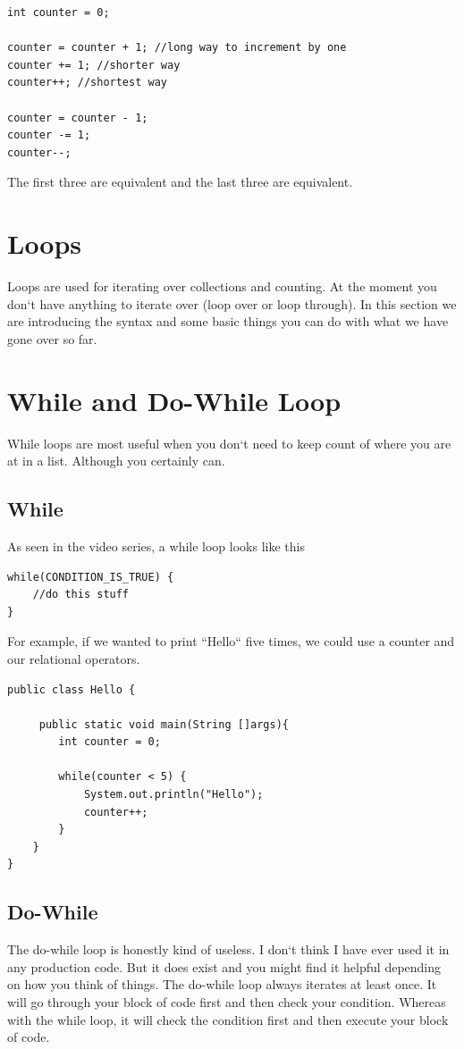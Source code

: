 \documentclass[11]{article}
\begin{document}
\begin{lstlisting}
int counter = 0;

counter = counter + 1; //long way to increment by one
counter += 1; //shorter way
counter++; //shortest way

counter = counter - 1;
counter -= 1;
counter--;
\end{lstlisting}

The first three are equivalent and the last three are equivalent.
\section{Loops}
Loops are used for iterating over collections and counting. At the moment you don`t have anything to iterate over (loop over or loop through). In this section we are introducing the syntax and some basic things you can do with what we have gone over so far.
\section{While and Do-While Loop}
While loops are most useful when you don`t need to keep count of where you are at in a list. Although you certainly can.
\subsection{While}
As seen in the video series, a while loop looks like this
\begin{lstlisting}
while(CONDITION_IS_TRUE) {
	//do this stuff
}
\end{lstlisting}

For example, if we wanted to print ``Hello`` five times, we could use a  counter and our relational operators.
\begin{lstlisting}
public class Hello {

     public static void main(String []args){
        int counter = 0;
        
        while(counter < 5) {
            System.out.println("Hello");
            counter++;
        }
    }
}
\end{lstlisting}

\subsection{Do-While}
The do-while loop is honestly kind of useless. I don`t think I have ever used it in any production code. But it does exist and you might find it helpful depending on how you think of things. The do-while loop always iterates at least once. It will go through your block of code first and then check your condition. Whereas with the while loop, it will check the condition first and then execute your block of code.\\
\end{document}
